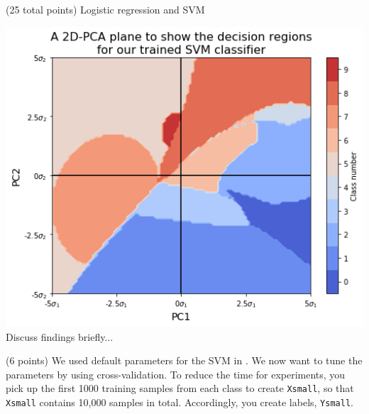 \documentclass[12pt]{article}
\begin{document}
\begin{question}{(25 total points) Logistic regression and SVM}
\begin{subquestion}
      \begin{answerbox}{50em}
         \includegraphics[width=1\textwidth]{images/q24.png}
        Discuss findings briefly...
      \end{answerbox}
  


   \end{subquestion}

   \begin{subquestion}{(6 points)
       We used default parameters for the SVM in .
       We now want to tune the parameters by using cross-validation.
       To reduce the time for experiments, you pick up the first 1000
       training samples from each class to create \texttt{Xsmall}, so that \texttt{Xsmall}
       contains 10,000 samples in total. Accordingly, you create
       labels, \texttt{Ysmall}.
     } \label{Q2.5}


   


\end{subquestion}
\end{question}
\end{document}
